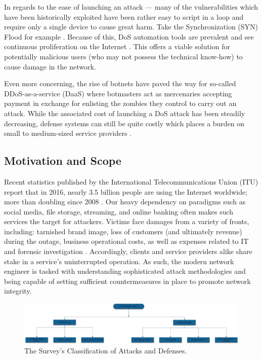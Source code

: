 \documentclass[conference]{IEEEtran}
\begin{document}
In regards to the ease of launching an attack --- many of the vulnerabilities which have been historically exploited have been rather easy to script in a loop and require only a single device to cause great harm. Take the Synchronization (SYN) Flood for example \cite{SecuringCloudServers:Chapade}. Because of this, DoS automation tools are prevalent and see continuous proliferation on the Internet \cite{Filtration:Kalkan}. This offers a viable solution for potentially malicious users (who may not possess the technical know-how) to cause damage in the network. 

Even more concerning, the rise of botnets have paved the way for so-called DDoS-as-a-service (DaaS) where botmasters act as mercenaries accepting payment in exchange for enlisting the zombies they control to carry out an attack. While the associated cost of launching a DoS attack has been steadily decreasing, defense systems can still be quite costly which places a burden on small to medium-sized service providers \cite{Wood:DoSE}.

\subsection{Motivation and Scope}
Recent statistics published by the International Telecommunications Union (ITU) report that in 2016, nearly 3.5 billion people are using the Internet worldwide; more than doubling since 2008 \cite{ICTStats}. Our heavy dependency on paradigms such as social media, file storage, streaming, and online banking often makes such services the target for attackers. Victims face damages from a variety of fronts, including: tarnished brand image, loss of customers (and ultimately revenue) during the outage, business operational costs, as well as expenses related to IT and forensic investigation \cite{Arbor:WISR}. Accordingly, clients and service providers alike share stake in a service's uninterrupted operation. As such, the modern network engineer is tasked with understanding sophisticated attack methodologies and being capable of setting sufficient countermeasures in place to promote network integrity.

\begin{figure}[!t]
\centering
\includegraphics[width=7in]{flowDiagramTrafficManagement}
\caption{The Survey's Classification of Attacks and Defenses.}
\label{flowDiagramTrafficManagement.png}
\end{figure}
\end{document}
